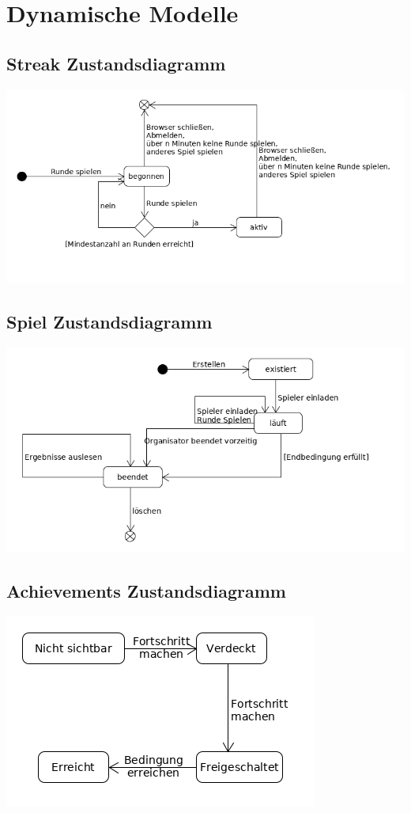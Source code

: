 \documentclass[a4paper]{scrreprt}
\begin{document}
    \section{Dynamische Modelle}
    \subsection{Streak Zustandsdiagramm}
    \label{fig:Streak_State}
    \includegraphics[width=\textwidth]{uml/export/Streak_Zustand.png}
    \subsection{Spiel Zustandsdiagramm}
    \label{fig:Spiel_State}
    \includegraphics[width=\textwidth]{uml/export/Spiel_Zustand.png}
    \subsection{Achievements Zustandsdiagramm}
    \label{fig:Achievment_State}
    \includegraphics[width=\textwidth]{uml/export/Achievment_State.png}
    
\end{document}
